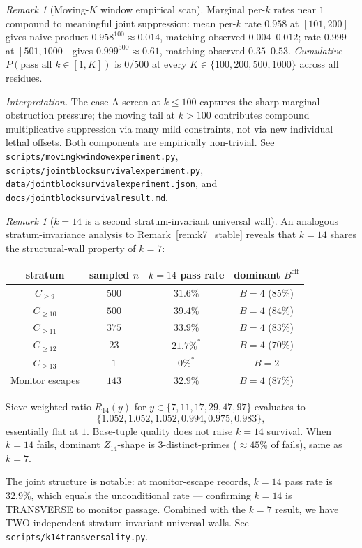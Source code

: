 \documentclass[11pt]{article}
\renewcommand{\_}{\origunderscore\allowbreak}
\theoremstyle{definition}
\theoremstyle{remark}
\newtheorem{remark}[theorem]{Remark}
\begin{document}
\begin{remark}[Moving-$K$ window empirical scan]
\noindent Marginal per-$k$ rates near $1$ compound to meaningful
joint suppression: mean per-$k$ rate $0.958$ at $[101, 200]$ gives
naive product $0.958^{100}\approx 0.014$, matching observed
$0.004$--$0.012$; rate $0.999$ at $[501, 1000]$ gives $0.999^{500}\approx 0.61$,
matching observed $0.35$--$0.53$.  \emph{Cumulative}
$P(\text{pass all }k\in[1, K])$ is $0/500$ at every $K\in\{100,
200, 500, 1000\}$ across all residues.

\emph{Interpretation.}  The case-A screen at $k\le 100$ captures
the sharp marginal obstruction pressure; the moving tail at
$k>100$ contributes compound multiplicative suppression via
many mild constraints, not via new individual lethal offsets.
Both components are empirically non-trivial.  See
\texttt{scripts/moving\_k\_window\_experiment.py},
\texttt{scripts/joint\_block\_survival\_experiment.py},
\texttt{data/joint\_block\_survival\_experiment.json}, and
\texttt{docs/joint\_block\_survival\_result.md}.
\end{remark}

\begin{remark}[$k=14$ is a second stratum-invariant universal wall]\label{rem:k14_wall}
An analogous stratum-invariance analysis to Remark~\ref{rem:k7_stable}
reveals that $k=14$ shares the structural-wall property of $k=7$:

\begin{center}
\begin{tabular}{c|ccc}
\hline
stratum & sampled $n$ & $k=14$ pass rate & dominant $B^{\mathrm{eff}}$ \\
\hline
$C_{\ge 9}$  & $500$ & $31.6\%$ & $B=4$ ($85\%$) \\
$C_{\ge 10}$ & $500$ & $39.4\%$ & $B=4$ ($84\%$) \\
$C_{\ge 11}$ & $375$ & $33.9\%$ & $B=4$ ($83\%$) \\
$C_{\ge 12}$ & $23$  & $21.7\%^*$ & $B=4$ ($70\%$) \\
$C_{\ge 13}$ & $1$   & $0\%^*$  & $B=2$ \\
Monitor escapes & $143$ & $32.9\%$ & $B=4$ ($87\%$) \\
\hline
\end{tabular}
\end{center}

\noindent Sieve-weighted ratio $R_{14}(y)$ for
$y\in\{7,11,17,29,47,97\}$ evaluates to
\[
  \{1.052, 1.052, 1.052, 0.994, 0.975, 0.983\},
\]
essentially flat at $1$.  Base-tuple quality does not raise $k=14$
survival.  When $k=14$ fails, dominant $Z_{14}$-shape is $3$-distinct-primes
($\approx 45\%$ of fails), same as $k=7$.

The joint structure is notable: at monitor-escape records, $k=14$ pass
rate is $32.9\%$, which equals the unconditional rate — confirming
$k=14$ is TRANSVERSE to monitor passage.  Combined with the $k=7$
result, we have TWO independent stratum-invariant universal walls.  See
\texttt{scripts/k14\_transversality.py}.
\end{remark}
\end{document}
